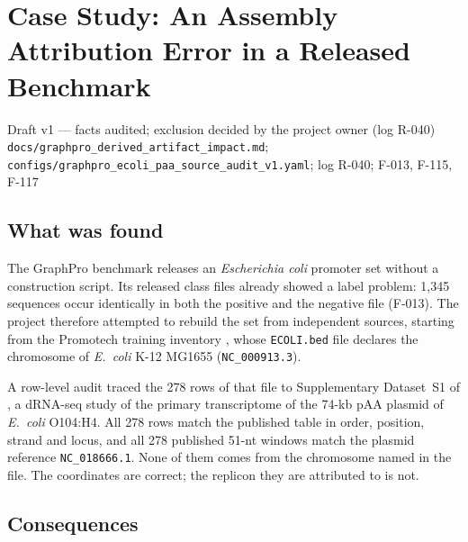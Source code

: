 
\section{Case Study: An Assembly Attribution Error in a Released Benchmark}\label{draft:paa-case}

{Draft v1 --- facts audited; exclusion decided by the project owner (log R-040)}
{\texttt{docs/graphpro\_derived\_artifact\_impact.md};
\texttt{configs/graphpro\_ecoli\_paa\_source\_audit\_v1.yaml}; log R-040; F-013, F-115, F-117}

\subsection{What was found}

The GraphPro benchmark \citep{zhang2024graphpro} releases an
\textit{Escherichia coli} promoter set without a construction script. Its
released class files already showed a label problem: 1,345 sequences occur
identically in both the positive and the negative file (F-013). The project
therefore attempted to rebuild the set from independent sources, starting
from the Promotech training inventory \citep{chevezguardado2021promotech}, whose
\texttt{ECOLI.bed} file declares the chromosome of \textit{E.~coli} K-12
MG1655 (\texttt{NC\_000913.3}).

A row-level audit traced the 278 rows of that file to Supplementary Dataset~S1
of \citet{berger2016paa}, a dRNA-seq study of the primary transcriptome of the
74-kb pAA plasmid of \textit{E.~coli} O104:H4. All 278 rows match the published
table in order, position, strand and locus, and all 278 published 51-nt windows
match the plasmid reference \texttt{NC\_018666.1}. None of them comes from the
chromosome named in the file. The coordinates are correct; the replicon they
are attributed to is not.

\subsection{Consequences}

